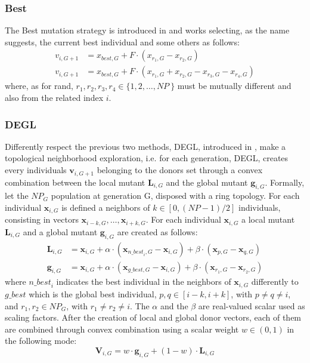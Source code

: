 \subsubsection{Best}
The Best mutation strategy is introduced in \cite{DESEHGOCS:1997} and works selecting, as the name suggests, the current best individual and some others as follows:
\begin{align}
	v_{i, G + 1} &= x_{\textit{best}, G} + F \cdot (x_{r_1, G} - x_{r_2, G}) \\
	v_{i, G + 1} &= x_{\textit{best}, G} + F \cdot (x_{r_1, G} + x_{r_2, G} - x_{r_3, G} - x_{r_4, G})
\end{align}
where, as for rand, $r_1, r_2, r_3, r_4 \in \{1, 2, \dots, \textit{NP}\ \}$ must be mutually different and also from the related index $i$.

\subsubsection{DEGL}
Differently respect the previous two methods, DEGL, introduced in \cite{DEGL:2009}, make a topological neighborhood exploration, i.e. for each generation, DEGL, creates every individuals $\textbf{v}_{i, G + 1}$ belonging to the donors set through a convex combination between the local mutant $\textbf{L}_{i, G}$ and the global mutant $\textbf{g}_{i, G}$.\newline\newline
Formally, let the $\textit{NP}_G$ population at generation G, disposed with a ring topology. For each individual $\textbf{x}_{i, G}$ is defined a neighbors of $k \in [0, (\textit{NP} - 1) / 2]$ individuals, consisting in vectors $\textbf{x}_{i - k, G}, \dots, \textbf{x}_{i + k, G}$. 
For each individual $\textbf{x}_{i, G}$ a local mutant $\textbf{L}_{i, G}$ and a global mutant $\textbf{g}_{i, G}$ are created as follows:
\begin{align}
	\textbf{L}_{i, G} &= \textbf{x}_{i, G} + \alpha \cdot (\textbf{x}_{\textit{n\_best}_i, G} - \textbf{x}_{i, G}) + \beta \cdot (\textbf{x}_{p, G} - \textbf{x}_{q, G}) \\
	\textbf{g}_{i, G} &= \textbf{x}_{i, G} + \alpha \cdot (\textbf{x}_{\textit{g\_best}, G} - \textbf{x}_{i, G}) + \beta \cdot (\textbf{x}_{r_1, G} - \textbf{x}_{r_2, G})
\end{align}
where $\textit{n\_best}_i$ indicates the best individual in the neighbors of $\textbf{x}_{i, G}$ differently to $\textit{g\_best}$ which is the global best individual, $p, q \in [i - k, i + k]$, with $p \neq q \neq i$, and $r_1, r_2 \in NP_{G}$, with $r_1 \neq r_2 \neq i$. The $\alpha$ and the $\beta$ are real-valued scalar used as scaling factors.\newline\newline
After the creation of local and global donor vectors, each of them are combined through convex combination using a scalar weight $w \in (0, 1)$ in the following mode:
\begin{equation}
	\textbf{V}_{i, G} = w \cdot \textbf{g}_{i, G} + (1 - w) \cdot \textbf{L}_{i, G}
\end{equation}

